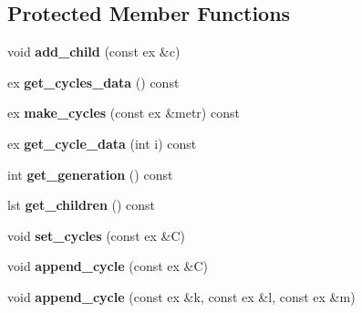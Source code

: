 \subsection*{Protected Member Functions}
\begin{DoxyCompactItemize}
\item 
\mbox{\label{class_moeb_inv_1_1cycle__node_ad17e2dddd5252b80cc5350713ea0f07d}} 
void {\bfseries add\+\_\+child} (const ex \&c)
\item 
\mbox{\label{class_moeb_inv_1_1cycle__node_a0a09e7f49e1aac1216cbd5d2021716a8}} 
ex {\bfseries get\+\_\+cycles\+\_\+data} () const
\item 
\mbox{\label{class_moeb_inv_1_1cycle__node_a2c6037caa2925d70141552a1bc5ac66c}} 
ex {\bfseries make\+\_\+cycles} (const ex \&metr) const
\item 
\mbox{\label{class_moeb_inv_1_1cycle__node_a6a95ac1be610f884431348e3574b83ec}} 
ex {\bfseries get\+\_\+cycle\+\_\+data} (int i) const
\item 
\mbox{\label{class_moeb_inv_1_1cycle__node_a4cd10d83c284f2e0e800347d4b6cb644}} 
int {\bfseries get\+\_\+generation} () const
\item 
\mbox{\label{class_moeb_inv_1_1cycle__node_a6f35e1942b883463f5066b635594f7ab}} 
lst {\bfseries get\+\_\+children} () const
\item 
\mbox{\label{class_moeb_inv_1_1cycle__node_abf4b0de955355786912c9c165a9441b9}} 
void {\bfseries set\+\_\+cycles} (const ex \&C)
\item 
\mbox{\label{class_moeb_inv_1_1cycle__node_add52343eaa8f5614a1b5f99d8b874681}} 
void {\bfseries append\+\_\+cycle} (const ex \&C)
\item 
\mbox{\label{class_moeb_inv_1_1cycle__node_aebf792111a9c9c8e698fe347edf86dd0}} 
void {\bfseries append\+\_\+cycle} (const ex \&k, const ex \&l, const ex \&m)
\item 

\end{DoxyCompactItemize}

